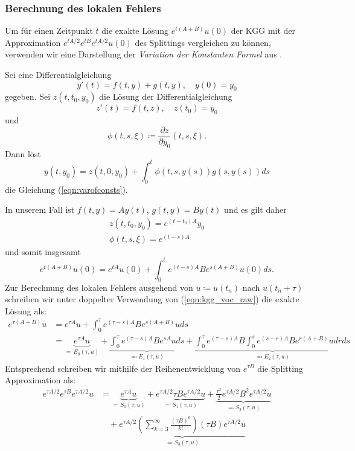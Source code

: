 \subsubsection*{Berechnung des lokalen Fehlers}
Um für einen Zeitpunkt $t$ die exakte Lösung $e^{t(A+B)}u(0)$ der KGG mit der Approximation $e^{tA/2}e^{tB}e^{tA/2}u(0)$ des Splittings vergleichen zu können, verwenden wir eine Darstellung der \emph{Variation der Konstanten Formel} aus \autocite{carassco2007}.
\begin{maththeorem}
\label{th:varofconstantsalkeseev}
Sei eine Differentialgleichung 
\begin{equation}
\label{eqn:varofconsts}
y'(t)=f(t,y)+g(t,y),\quad y(0)=y_0
\end{equation}
gegeben. Sei $z(t,t_0,y_0)$ die Lösung der Differentialgleichung 
\[z'(t)=f(t,z), \quad z(t_0)=y_0\]
und
\[\phi(t,s,\xi)\coloneqq\frac{\partial z}{\partial y_0}(t,s,\xi).\]
Dann löst
\[y(t,y_0)=z(t,0,y_0)+\int_0^t\phi(t,s,y(s))g(s,y(s))ds\]
die Gleichung (\ref{eqn:varofconsts}).
\end{maththeorem}
In unserem Fall ist $f(t,y)=Ay(t)$, $g(t,y)=By(t)$ und es gilt daher
\begin{align*}
z(t,t_0,y_0)=e^{(t-t_0)A}y_0\\
\phi(t,s,\xi)=e^{(t-s)A}
\end{align*}
und somit insgesamt
\begin{equation}
\label{eqn:kgg_voc_raw}
e^{t(A+B)}u(0)=e^{tA}u(0)+\int_0^te^{(t-s)A}Be^{s(A+B)}u(0)ds.
\end{equation}
Zur Berechnung des lokalen Fehlers ausgehend von $u\coloneqq u(t_n)$ nach $u(t_n+\tau)$ schreiben wir unter doppelter Verwendung von (\ref{eqn:kgg_voc_raw}) die exakte Lösung als:
\begin{equation}
\begin{split}
e^{\tau(A+B)}u&=e^{\tau A}u+\int_0^\tau e^{(\tau - s)A}Be^{s(A+B)}uds\\
&=\underbrace{e^{\tau A}u}_{\eqqcolon E_0(\tau,u)}+\underbrace{\int_0^\tau e^{(\tau - s)A}Be^{sA}uds}_{\eqqcolon E_1(\tau,u)}
+\underbrace{\int_0^\tau e^{(\tau - s)A}B\int_0^s e^{(s-r)A}Be^{r(A+B)}udrds}_{\eqqcolon E_2(\tau, u)}
\end{split}
\end{equation}
Entsprechend schreiben wir mithilfe der Reihenentwicklung von $e^{\tau B}$ die Splitting Approximation als:
\begin{equation}
\begin{split}
e^{\tau A/2}e^{\tau B}e^{\tau A/2}u&=\underbrace{e^{\tau A}u}_{\eqqcolon S_0(\tau,u)}+\underbrace{e^{\tau A/2}\tau Be^{\tau A/2}u}_{\eqqcolon S_1(\tau,u)}+\underbrace{\frac{\tau^2}{2}e^{\tau A/2}B^2e^{\tau A/2}u}_{\eqqcolon S_2(\tau,u)}\\
&\quad +\underbrace{e^{\tau A/2}\left(\sum_{k=3}^\infty \frac{(\tau B)^k}{k!}\right)(\tau B)e^{\tau A/2}u}_{\eqqcolon S_3(\tau,u)}
\end{split}
\end{equation}
